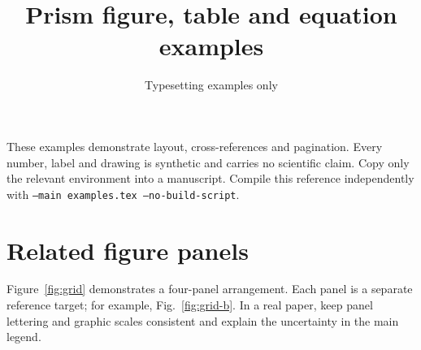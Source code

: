 \documentclass[11pt,a4paper]{article}
\title{Prism figure, table and equation examples}
\author{Typesetting examples only}
\date{}
\begin{document}
\maketitle
These examples demonstrate layout, cross-references and pagination. Every
number, label and drawing is synthetic and carries no scientific claim.
Copy only the relevant environment into a manuscript. Compile this reference
independently with \texttt{--main examples.tex --no-build-script}.

\section{Related figure panels}
Figure~\ref{fig:grid} demonstrates a four-panel arrangement. Each panel is a
separate reference target; for example, Fig.~\ref{fig:grid-b}. In a real paper,
keep panel lettering and graphic scales consistent and explain the uncertainty
in the main legend.
\end{document}
